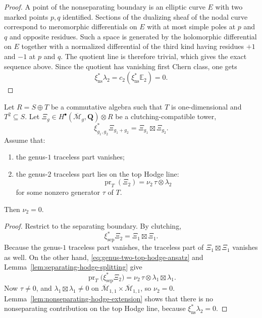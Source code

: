 \begin{proof}
A point of the nonseparating boundary is an elliptic curve \(E\) with two
marked points \(p,q\) identified. Sections of the dualizing sheaf of
the nodal curve correspond to meromorphic differentials on \(E\) with at
most simple poles at \(p\) and \(q\) and opposite residues. Such a space
is generated by the holomorphic differential on \(E\) together with a
normalized differential of the third kind having residues \(+1\) and
\(-1\) at \(p\) and \(q\). The quotient line is therefore trivial, which
gives the exact sequence above. Since the quotient has vanishing first
Chern class, one gets
\[
\xi_{\mathrm{ns}}^*\lambda_2
=c_2(\xi_{\mathrm{ns}}^*\mathbb E_2)=0.
\]
\end{proof}

\begin{theorem}
\label{thm:genus-two-transparency}
Let \(R=S\oplus T\) be a commutative algebra such that \(T\) is
one-dimensional and \(T^2\subseteq S\). Let
\(\Xi_g\in H^\bullet(\overline{\mathcal M}_g,\mathbf Q)\otimes R\) be a
clutching-compatible tower,
\[
\xi_{g_1,g_2}^*\Xi_{g_1+g_2}=\Xi_{g_1}\boxtimes\Xi_{g_2}.
\]
Assume that:
\begin{enumerate}[label=\textup{(\roman*)}]
\item the genus-\(1\) traceless part vanishes;
\item the genus-\(2\) traceless part lies on the top Hodge line:
 \begin{equation}
 \label{eq:genus-two-top-hodge-ansatz}
 \operatorname{pr}_T(\Xi_2)=\nu_2\,\tau\otimes\lambda_2
 \end{equation}
 for some nonzero generator \(\tau\) of \(T\).
\end{enumerate}
Then \(\nu_2=0\).
\end{theorem}

\begin{proof}
Restrict to the separating boundary. By clutching,
\[
\xi_{\mathrm{sep}}^*\Xi_2=\Xi_1\boxtimes \Xi_1.
\]
Because the genus-\(1\) traceless part vanishes, the traceless part of
\(\Xi_1\boxtimes\Xi_1\) vanishes as well. On the other hand,
\eqref{eq:genus-two-top-hodge-ansatz} and
Lemma~\ref{lem:separating-hodge-splitting} give
\[
\operatorname{pr}_T\bigl(\xi_{\mathrm{sep}}^*\Xi_2\bigr)
=
\nu_2\,\tau\otimes \lambda_1\boxtimes\lambda_1.
\]
Now \(\tau\neq 0\), and
\(\lambda_1\boxtimes\lambda_1\neq 0\) on
\(\overline{\mathcal M}_{1,1}\times\overline{\mathcal M}_{1,1}\), so
\(\nu_2=0\). Lemma~\ref{lem:nonseparating-hodge-extension} shows that
there is no nonseparating contribution on the top Hodge line, because
\(\xi_{\mathrm{ns}}^*\lambda_2=0\).
\end{proof}

